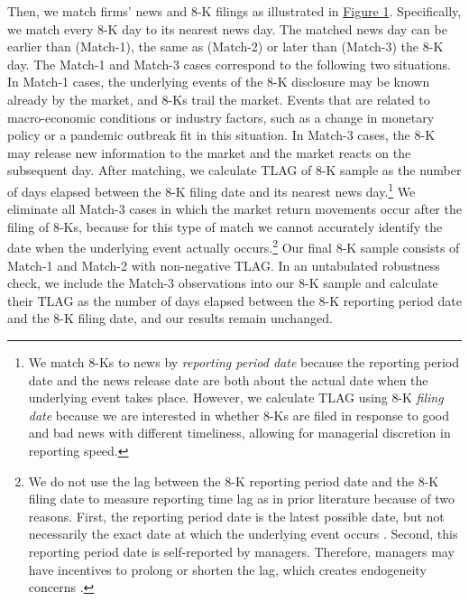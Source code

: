 \documentclass[letterpaper,12pt]{article}
\begin{document}
\begin{spacing}{1.5}
Then, we match firms' news and 8-K filings as illustrated in \hyperref[fig1]{Figure 1}. Specifically, we match every 8-K day to its nearest news day. The matched news day can be earlier than (Match-1), the same as (Match-2) or later than (Match-3) the 8-K day. The Match-1 and Match-3 cases correspond to the following two situations. In Match-1 cases, the underlying events of the 8-K disclosure may be known already by the market, and 8-Ks trail the market. Events that are related to macro-economic conditions or industry factors, such as a change in monetary policy or a pandemic outbreak fit in this situation. In Match-3 cases, the 8-K may release new information to the market and the market reacts on the subsequent day. After matching, we calculate TLAG of 8-K sample as the number of days elapsed between the 8-K filing date and its nearest news day.\footnote{We match 8-Ks to news by \textit{reporting period date} because the reporting period date and the news release date are both about the actual date when the underlying event takes place. However, we calculate TLAG using 8-K \textit{filing date} because we are interested in whether 8-Ks are filed in response to good and bad news with different timeliness, allowing for managerial discretion in reporting speed.} We eliminate all Match-3 cases in which the market return movements occur after the filing of 8-Ks, because for this type of match we cannot accurately identify the date when the underlying event actually occurs.\footnote{We do not use the lag between the 8-K reporting period date and the 8-K filing date to measure reporting time lag as in prior literature \cite{carterRelevanceForm8K1999, niessnerStrategicDisclosureTiming2015, chapmanInformationOverloadDisclosure2019} because of two reasons. First, the reporting period date is the latest possible date, but not necessarily the exact date at which the underlying event occurs \cite{secFinalRuleAdditional2004}. Second, this reporting period date is self-reported by managers. Therefore, managers may have incentives to prolong or shorten the lag, which creates endogeneity concerns \cite{chapmanInformationOverloadDisclosure2019}. } Our final 8-K sample consists of Match-1 and Match-2 with non-negative TLAG. In an untabulated robustness check, we include the Match-3 observations into our 8-K sample and calculate their TLAG as the number of days elapsed between the 8-K reporting period date and the 8-K filing date, and our results remain unchanged. 


\end{spacing}
\end{document}
